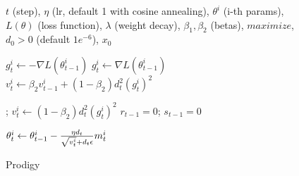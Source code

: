 \begin{figure}[t]
\begin{algorithm}[H]
    \caption{Prodigy}\label{algorithm:prodigy}
    \begin{algorithmic}[1]
        \Require $t$ (step), $\eta$ (lr, default 1 with cosine annealing), $\theta^i$ (i-th params), $L(\theta)$ (loss function), $\lambda$ (weight decay), $\beta_1, \beta_2$ (betas),  $maximize$, $d_0 > 0$ (default $1e^{-6}$), $x_0$
        
        \Repeat
                \State $g^i_t \gets -\nabla L(\theta^i_{t-1})$
            \Else
                \State $g^i_t \gets \nabla L(\theta^i_{t-1})$
            \EndIf
            \State
            \State {}
                \State $v^i_t \gets \beta_2 v^i_{t-1} + (1-\beta_2) d_t^2 (g^i_t)^2 $
                
            \Else
                \State {}; $v^i_t \gets (1-\beta_2) d_t^2 (g^i_t)^2 $
                \State $r_{t-1} = 0$; $s_{t-1} = 0$
            \EndIf


        

            \State
            
            \State {}
            \State
            \State $\theta^i_t \gets \theta^i_{t-1} - \text{$ \frac{\eta d_t}{\sqrt{v^i_t} + d_t \epsilon}m^i_t $} $

        \EndFor
    \end{algorithmic}
\end{algorithm}
\end{figure}



